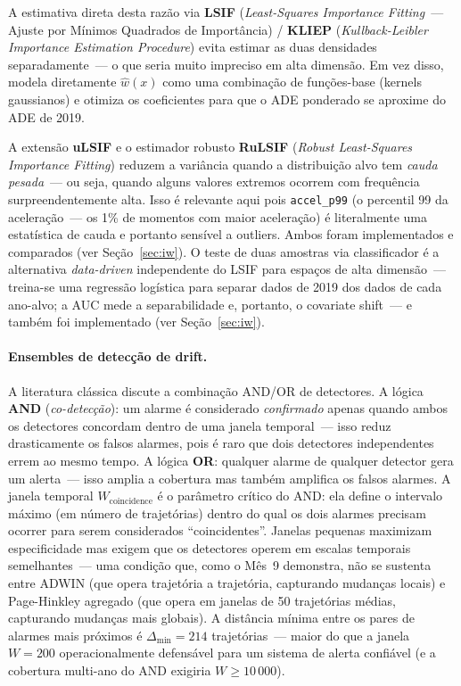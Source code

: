 \documentclass[11pt,a4paper]{article}
\begin{document}
A estimativa direta desta raz\~ao via \textbf{LSIF} (\emph{Least-Squares Importance Fitting}~--- Ajuste por M\'inimos Quadrados de Import\^ancia) / \textbf{KLIEP} (\emph{Kullback-Leibler Importance Estimation Procedure}) \cite{kliep,sugiyama_book} evita estimar as duas densidades separadamente~--- o que seria muito impreciso em alta dimens\~ao. Em vez disso, modela diretamente $\hat{w}(x)$ como uma combina\c{c}\~ao de fun\c{c}\~oes-base (kernels gaussianos) e otimiza os coeficientes para que o ADE ponderado se aproxime do ADE de 2019.

A extens\~ao \textbf{uLSIF} \cite{kanamori2009} e o estimador robusto \textbf{RuLSIF} \cite{yamada2013} (\emph{Robust Least-Squares Importance Fitting}) reduzem a vari\^ancia quando a distribui\c{c}\~ao alvo tem \emph{cauda pesada}~--- ou seja, quando alguns valores extremos ocorrem com frequ\^encia surpreendentemente alta. Isso \'e relevante aqui pois \texttt{accel\_p99} (o percentil 99 da acelera\c{c}\~ao~--- os 1\% de momentos com maior acelera\c{c}\~ao) \'e literalmente uma estat\'istica de cauda e portanto sens\'ivel a outliers. Ambos foram implementados e comparados (ver Se\c{c}\~ao~\ref{sec:iw}). O teste de duas amostras via classificador \cite{lopezpaz2017} \'e a alternativa \emph{data-driven} independente do LSIF para espa\c{c}os de alta dimens\~ao~--- treina-se uma regress\~ao log\'istica para separar dados de 2019 dos dados de cada ano-alvo; a AUC mede a separabilidade e, portanto, o covariate shift~--- e tamb\'em foi implementado (ver Se\c{c}\~ao~\ref{sec:iw}).

\paragraph{Ensembles de detec\c{c}\~ao de drift.}
A literatura cl\'assica \cite{gama2014,lu2019} discute a combina\c{c}\~ao AND/OR de detectores. A l\'ogica \textbf{AND} (\emph{co-detec\c{c}\~ao}): um alarme \'e considerado \emph{confirmado} apenas quando ambos os detectores concordam dentro de uma janela temporal~--- isso reduz drasticamente os falsos alarmes, pois \'e raro que dois detectores independentes errem ao mesmo tempo. A l\'ogica \textbf{OR}: qualquer alarme de qualquer detector gera um alerta~--- isso amplia a cobertura mas tamb\'em amplifica os falsos alarmes. A janela temporal $W_\text{coincidence}$ \'e o par\^ametro cr\'itico do AND: ela define o intervalo m\'aximo (em n\'umero de trajet\'orias) dentro do qual os dois alarmes precisam ocorrer para serem considerados ``coincidentes''. Janelas pequenas maximizam especificidade mas exigem que os detectores operem em escalas temporais semelhantes~--- uma condi\c{c}\~ao que, como o M\^es~9 demonstra, n\~ao se sustenta entre ADWIN (que opera trajet\'oria a trajet\'oria, capturando mudan\c{c}as locais) e Page-Hinkley agregado (que opera em janelas de 50 trajet\'orias m\'edias, capturando mudan\c{c}as mais globais). A dist\^ancia m\'inima entre os pares de alarmes mais pr\'oximos \'e $\Delta_{\min} = 214$ trajet\'orias~--- maior do que a janela $W=200$ operacionalmente defens\'avel para um sistema de alerta confi\'avel (e a cobertura multi-ano do AND exigiria $W\!\geq\!10\,000$).
\end{document}
